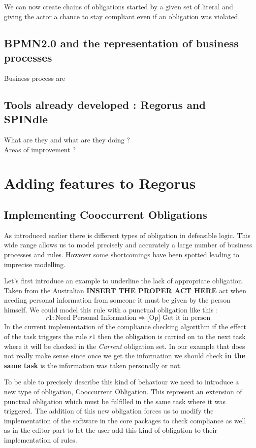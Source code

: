 \documentclass[10pt]{report}
\begin{document}
We can now create chains of obligations started by a given set of literal and giving the actor a chance to stay compliant even if an obligation was violated. \autocite{NormComplianceinBPModeling}

\subsection{BPMN2.0 and the representation of business processes}
Business process are 



\subsection{Tools already developed : Regorus and SPINdle}
What are they and what are they doing ?\\
Areas of improvement ?


\newpage
\section{Adding features to Regorus}
\subsection{Implementing Cooccurrent Obligations}
As introduced earlier there is different types of obligation in defeasible logic. This wide range allows us to model precisely and accurately a large number of business processes and rules. However some shortcomings have been spotted leading to imprecise modelling.

Let's first introduce an example to underline the lack of appropriate obligation. Taken from the Australian \textbf{INSERT THE PROPER ACT HERE} act when needing personal information from someone it must be given by the person himself. We could model this rule with a punctual obligation like this :
\begin{equation}
r1 : \text{Need Personal Information} \Rightarrow \text{[Op] Get it in person}
\end{equation}
In the current implementation of the compliance checking algorithm if the effect of the task triggers the rule $r1$ then the obligation is carried on to the next task where it will be checked in the \textit{Current} obligation set. In our example that does not really make sense since once we get the information we should check \textbf{in the same task} is the information was taken personally or not.

To be able to precisely describe this kind of behaviour we need to introduce a new type of obligation, Cooccurrent Obligation. This represent an extension of punctual obligation which must be fulfilled in the same task where it was triggered. The addition of this new obligation forces us to modify the implementation of the software in the core packages to check compliance as well as in the editor part to let the user add this kind of obligation to their implementation of rules.
\end{document}
